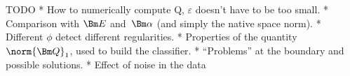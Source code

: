 
\Red

\noindent TODO
\begitems
* How to numerically compute Q, $\varepsilon$ doesn't have to be too small.
* Comparison with $\Bm E$ and~$\Bm\alpha$ (and simply the native space norm).
* Different $\phi$ detect different regularities.
* Properties of the quantity~$\norm{\Bm Q}_1$, used to build the classifier.
* ``Problems'' at the boundary and possible solutions.
* Effect of noise in the data
\enditems



\Black


